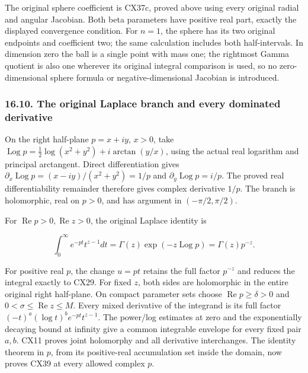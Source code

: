\documentclass[
  11pt,
]{article}
\makeatletter
\let\ReaderOriginalAnchorStart\hyper@anchorstart
\let\ReaderOriginalAnchorEnd\hyper@anchorend
\let\ReaderPendingAliases\@empty
\def\ReaderArmAliases#1{\gdef\ReaderPendingAliases{#1}}
\def\hyper@anchorstart#1{\ReaderIfNativeAnchorTF{#1}{\ReaderPendingAliases\global\let\ReaderPendingAliases\@empty}{}\ReaderOriginalAnchorStart{#1}}
\makeatother
\begin{document}
The original sphere coefficient is CX37c, proved above using every
original radial and angular Jacobian. Both beta parameters have positive
real part, exactly the displayed convergence condition. For \(n=1\), the
sphere has its two original endpoints and coefficient two; the same
calculation includes both half-intervals. In dimension zero the ball is
a single point with mass one; the rightmost Gamma quotient is also one
wherever its original integral comparison is used, so no
zero-dimensional sphere formula or negative-dimensional Jacobian is
introduced.

\ReaderArmAliases{\ReaderOriginalAnchorStart{AN03-CN-COMPLEX-010}\ReaderOriginalAnchorEnd\begingroup\expandafter\def\csname @currentHref\endcsname{AN03-CN-COMPLEX-010}\label{AN03-CN-COMPLEX-010}\endgroup\ReaderOriginalAnchorStart{the-original-laplace-branch-and-every-dominated-derivative}\ReaderOriginalAnchorEnd}
\subsubsection{16.10. The original Laplace branch and every dominated
derivative}\label{the-original-laplace-branch-and-every-dominated-derivative}

On the right half-plane \(p=x+iy\), \(x>0\), take
\(\operatorname{Log}p=\frac12\log(x^2+y^2)+i\arctan(y/x)\), using the
actual real logarithm and principal arctangent. Direct differentiation
gives \(\partial_x\operatorname{Log}p=(x-iy)/(x^2+y^2)=1/p\) and
\(\partial_y\operatorname{Log}p=i/p\). The proved real differentiability
remainder therefore gives complex derivative \(1/p\). The branch is
holomorphic, real on \(p>0\), and has argument in \((-\pi/2,\pi/2)\).

For \(\operatorname{Re}p>0,\operatorname{Re}z>0\), the original Laplace
identity is

\[
\int_0^\infty e^{-pt}t^{z-1}dt
       =\Gamma(z)\exp(-z\operatorname{Log}p)
       =\Gamma(z)p^{-z}.
\tag{CX39}
\]

For positive real \(p\), the change \(u=pt\) retains the full factor
\(p^{-z}\) and reduces the integral exactly to CX29. For fixed \(z\),
both sides are holomorphic in the entire original right half-plane. On
compact parameter sets choose \(\operatorname{Re}p\geq\delta>0\) and
\(0<\sigma\leq\operatorname{Re}z\leq M\). Every mixed derivative of the
integrand is its full factor \((-t)^a(\log t)^b e^{-pt}t^{z-1}\). The
power/log estimates at zero and the exponentially decaying bound at
infinity give a common integrable envelope for every fixed pair \(a,b\).
CX11 proves joint holomorphy and all derivative interchanges. The
identity theorem in \(p\), from its positive-real accumulation set
inside the domain, now proves CX39 at every allowed complex \(p\).
\end{document}
